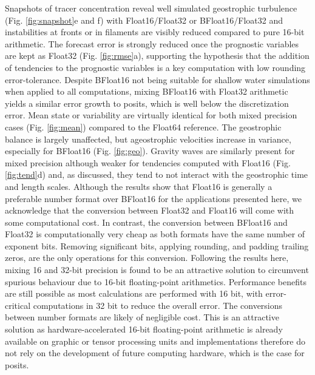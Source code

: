 \documentclass[draft]{agujournal2019}
\begin{document}
Snapshots of tracer concentration reveal well simulated geostrophic turbulence
(Fig. \ref{fig:snapshot}e and f) with Float16/Float32 or BFloat16/Float32 and
instabilities at fronts or in filaments are visibly reduced compared to pure
16-bit arithmetic. The forecast error is strongly reduced once the prognostic
variables are kept as Float32 (Fig. \ref{fig:rmse}a), supporting the hypothesis
that the addition of tendencies to the prognostic variables is a key computation
with low rounding error-tolerance. Despite BFloat16 not being suitable for shallow
water simulations when applied to all computations, mixing BFloat16 with Float32
arithmetic yields a similar error growth to posits, which is well below the
discretization error. Mean state or variability are virtually identical for both
mixed precision cases (Fig. \ref{fig:mean}) compared to the Float64 reference.
The geostrophic balance is largely unaffected, but ageostrophic velocities increase
in variance, especially for BFloat16 (Fig. \ref{fig:geo}). Gravity waves are
similarly present for mixed precision although weaker for tendencies computed
with Float16 (Fig. \ref{fig:tend}d) and, as discussed, they tend to not interact
with the geostrophic time and length scales. Although the results show that Float16
is generally a preferable number format over BFloat16 for the applications presented
here, we acknowledge that the conversion between Float32 and Float16 will come
with some computational cost. In contrast, the conversion between BFloat16 and
Float32 is computationally very cheap as both formats have the same number of
exponent bits. Removing significant bits, applying rounding, and padding
trailing zeros, are the only operations for this conversion. Following the
results here, mixing 16 and 32-bit precision is found to be an attractive solution
to circumvent spurious behaviour due to 16-bit floating-point arithmetics.
Performance benefits are still possible as most calculations are performed with
16 bit, with error-critical computations in 32 bit to reduce the overall error.
The conversions between number formats are likely of negligible cost. This is an
attractive solution as hardware-accelerated 16-bit floating-point arithmetic is
already available on graphic or tensor processing units and implementations
therefore do not rely on the development of future computing hardware, which is
the case for posits.
\end{document}
